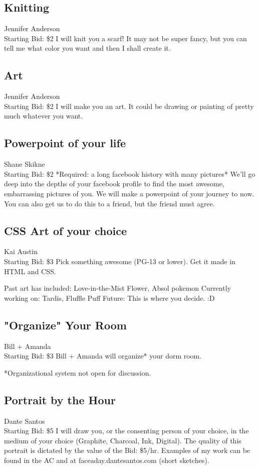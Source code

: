 \documentclass[11pt]{article}
\begin{document}
\subsection{Knitting}
Jennifer Anderson
\\
Starting Bid: \$2
\newline
I will knit you a scarf! It may not be super fancy, but you can tell me what color you want and then I shall create it.
\subsection{Art}
Jennifer Anderson
\\
Starting Bid: \$2
\newline
I will make you an art. It could be drawing or painting of pretty much whatever you want.
\subsection{Powerpoint of your life}
Shane Skikne
\\
Starting Bid: \$2
\newline
*Required: a long facebook history with many pictures* We'll go deep into the depths of your facebook profile to find the most awesome, embarrassing  pictures of you. We will make a powerpoint of your journey to now. You can also get us to do this to a friend, but the friend  must agree.
\subsection{CSS Art of your choice}
Kai Austin
\\
Starting Bid: \$3
\newline
Pick something awesome (PG-13 or lower). Get it made in HTML and CSS.

Past art has included: Love-in-the-Mist Flower, Absol pokemon
Currently working on: Tardis, Fluffle Puff
Future: This is where you decide. :D
\subsection{"Organize" Your Room}
Bill + Amanda
\\
Starting Bid: \$3
\newline
Bill + Amanda will organize* your dorm room. 

*Organizational system not open for discussion.
\subsection{Portrait by the Hour}
Dante Santos
\\
Starting Bid: \$5
\newline
I will draw you, or the consenting person of your choice, in the medium of your choice (Graphite, Charcoal, Ink, Digital).  The quality of this portrait is dictated by the value of the Bid:  \$5/hr.  Examples of my work can be found in the AC and at faceaday.dantesantos.com (short sketches).
\end{document}
